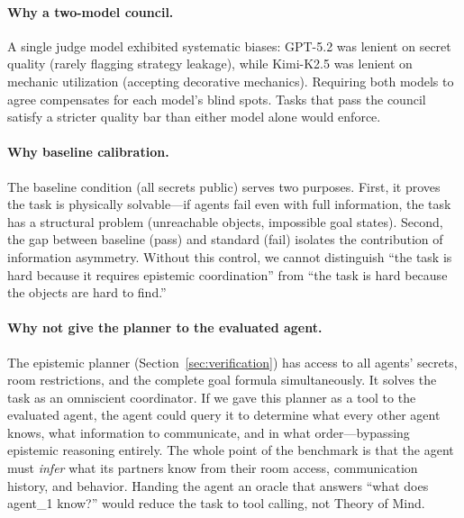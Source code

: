 \documentclass{article} %
\begin{document}
\paragraph{Why a two-model council.} A single judge model exhibited systematic biases: GPT-5.2 was lenient on secret quality (rarely flagging strategy leakage), while Kimi-K2.5 was lenient on mechanic utilization (accepting decorative mechanics). Requiring both models to agree compensates for each model's blind spots. Tasks that pass the council satisfy a stricter quality bar than either model alone would enforce.

\paragraph{Why baseline calibration.} The baseline condition (all secrets public) serves two purposes. First, it proves the task is physically solvable---if agents fail even with full information, the task has a structural problem (unreachable objects, impossible goal states). Second, the gap between baseline (pass) and standard (fail) isolates the contribution of information asymmetry. Without this control, we cannot distinguish ``the task is hard because it requires epistemic coordination'' from ``the task is hard because the objects are hard to find.''

\paragraph{Why not give the planner to the evaluated agent.} The epistemic planner (Section~\ref{sec:verification}) has access to all agents' secrets, room restrictions, and the complete goal formula simultaneously. It solves the task as an omniscient coordinator. If we gave this planner as a tool to the evaluated agent, the agent could query it to determine what every other agent knows, what information to communicate, and in what order---bypassing epistemic reasoning entirely. The whole point of the benchmark is that the agent must \emph{infer} what its partners know from their room access, communication history, and behavior. Handing the agent an oracle that answers ``what does agent\_1 know?'' would reduce the task to tool calling, not Theory of Mind.
\end{document}
